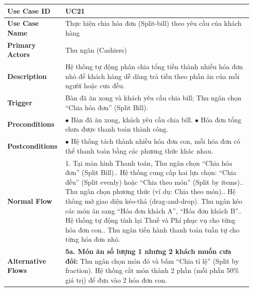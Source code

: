 \begin{longtable}{|p{3.5cm}|p{12.5cm}|}
\hline
\textbf{Use Case ID} & UC21 \\ \hline
\textbf{Use Case Name} & Thực hiện chia hóa đơn (Split-bill) theo yêu cầu của khách hàng \\ \hline
\textbf{Primary Actors} & Thu ngân (Cashiers) \\ \hline
\textbf{Description} & Hệ thống tự động phân chia tổng tiền thành nhiều hóa đơn nhỏ để khách hàng dễ dàng trả tiền theo phần ăn của mỗi người hoặc cưa đều. \\ \hline
\textbf{Trigger} & Bàn đã ăn xong và khách yêu cầu chia bill; Thu ngân chọn ``Chia hóa đơn'' (Split Bill). \\ \hline
\textbf{Preconditions} &
$\bullet$ Bàn đã ăn xong, khách yêu cầu chia bill.\newline
$\bullet$ Hóa đơn tổng chưa được thanh toán thành công. \\ \hline
\textbf{Postconditions} & $\bullet$ Hệ thống tách thành nhiều hóa đơn con, mỗi hóa đơn có thể thanh toán bằng các phương thức khác nhau. \\ \hline
\textbf{Normal Flow} &
1. Tại màn hình Thanh toán, Thu ngân chọn ``Chia hóa đơn'' (Split Bill).\newline
2. Hệ thống cung cấp hai lựa chọn: ``Chia đều'' (Split evenly) hoặc ``Chia theo món'' (Split by items).\newline
3. Thu ngân chọn phương thức (ví dụ: Chia theo món).\newline
4. Hệ thống mở giao diện kéo-thả (drag-and-drop). Thu ngân kéo các món ăn sang ``Hóa đơn khách A'', ``Hóa đơn khách B''.\newline
5. Hệ thống tự động tính lại Thuế và Phí phục vụ cho từng hóa đơn con.\newline
6. Thu ngân tiến hành thanh toán tuần tự cho từng hóa đơn nhỏ. \\ \hline
\textbf{Alternative Flows} &
\textbf{5a. Món ăn số lượng 1 nhưng 2 khách muốn cưa đôi:} Thu ngân chọn món đó và bấm ``Chia tỉ lệ'' (Split by fraction). Hệ thống cắt món thành 2 phần (mỗi phần 50\% giá trị) để đưa vào 2 hóa đơn con. \\ \hline
\end{longtable}

